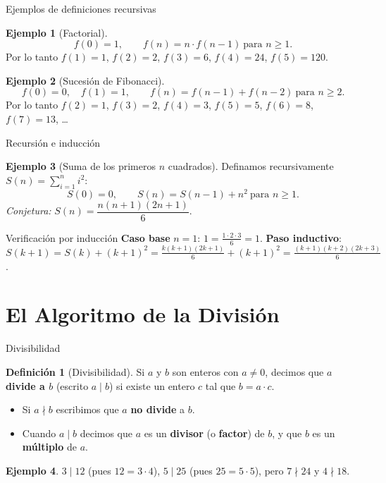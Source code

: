 \documentclass[10pt,aspectratio=169]{beamer}
\theoremstyle{definition}
\newtheorem{definicion}{Definición}
\newtheorem{ejemplo}{Ejemplo}
\theoremstyle{plain}
\theoremstyle{remark}
\begin{document}
\begin{frame}{Ejemplos de definiciones recursivas}
  \begin{ejemplo}[Factorial]
    \[
      f(0)=1,\qquad f(n)=n\cdot f(n-1)\ \text{para } n\ge 1.
    \]
    Por lo tanto $f(1)=1$, $f(2)=2$, $f(3)=6$, $f(4)=24$, $f(5)=120$.
  \end{ejemplo}
  \begin{ejemplo}[Sucesión de Fibonacci]
    \[
      f(0)=0,\quad f(1)=1,\qquad f(n)=f(n-1)+f(n-2)\ \text{para } n\ge 2.
    \]
    Por lo tanto $f(2)=1$, $f(3)=2$, $f(4)=3$, $f(5)=5$, $f(6)=8$,
    $f(7)=13$, \ldots
  \end{ejemplo}
\end{frame}

\begin{frame}{Recursión e inducción}
  \begin{ejemplo}[Suma de los primeros $n$ cuadrados]
    Definamos recursivamente $S(n)=\sum_{i=1}^{n} i^2$:
    \[
      S(0)=0,\qquad S(n)=S(n-1)+n^2\ \text{para } n\ge 1.
    \]
    \emph{Conjetura:} $S(n)=\dfrac{n(n+1)(2n+1)}{6}$.
  \end{ejemplo}
  \begin{block}{Verificación por inducción}
    \textbf{Caso base} $n=1$: $1=\frac{1\cdot 2\cdot 3}{6}=1$. \checkmark
    \vspace{0.2em}
    \textbf{Paso inductivo}:
    $S(k+1)=S(k)+(k+1)^2 = \frac{k(k+1)(2k+1)}{6} + (k+1)^2
     = \frac{(k+1)(k+2)(2k+3)}{6}$. \checkmark
  \end{block}
\end{frame}

\section{El Algoritmo de la División}
\begin{frame}{Divisibilidad}
  \begin{definicion}[Divisibilidad]
    Si $a$ y $b$ son enteros con $a\ne 0$, decimos que \textbf{$a$ divide
    a $b$} (escrito $a\mid b$) si existe un entero $c$ tal que
    $b = a\cdot c$.
    \begin{itemize}
      \item Si $a\nmid b$ escribimos que $a$ \textbf{no divide} a $b$.
      \item Cuando $a\mid b$ decimos que $a$ es un \textbf{divisor} (o
            \textbf{factor}) de $b$, y que $b$ es un \textbf{múltiplo} de
            $a$.
    \end{itemize}
  \end{definicion}
  \vspace{0.3em}
  \begin{ejemplo}
    $3\mid 12$ (pues $12=3\cdot 4$), $5\mid 25$ (pues $25=5\cdot 5$),
    pero $7\nmid 24$ y $4\nmid 18$.
  \end{ejemplo}
\end{frame}
\end{document}
